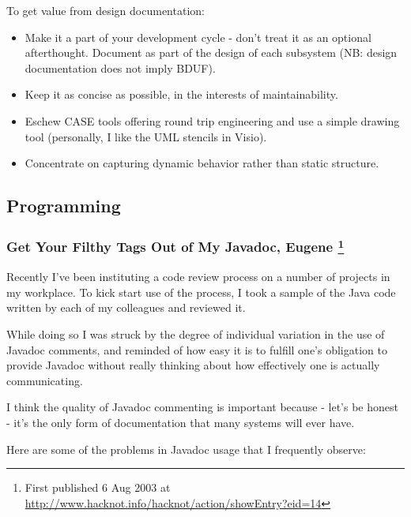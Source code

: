 \documentclass{article}
\begin{document}
\begin{enumerate}
To get value from design documentation:

\begin{itemize}
\item Make it a part of your development cycle - don't treat it as an
optional afterthought. Document as part of the design of each
subsystem (NB: design documentation does not imply BDUF).
\item Keep it as concise as possible, in the interests of maintainability.
\item Eschew CASE tools offering round trip engineering and use a simple
drawing tool (personally, I like the UML stencils in Visio).\\
\item Concentrate on capturing dynamic behavior rather than static
structure.
\end{itemize}
\end{enumerate}

\subsection{Programming}
\label{sec:orgheadline278}

\subsubsection{Get Your Filthy Tags Out of My Javadoc, Eugene \footnote{First published 6 Aug 2003 at
\url{http://www.hacknot.info/hacknot/action/showEntry?eid=14}}}
\label{sec:orgheadline263}

Recently I've been instituting a code review process on a number of
projects in my workplace. To kick start use of the process, I took a
sample of the Java code written by each of my colleagues and reviewed
it.

While doing so I was struck by the degree of individual variation in the
use of Javadoc comments, and reminded of how easy it is to fulfill one's
obligation to provide Javadoc without really thinking about how
effectively one is actually communicating.

I think the quality of Javadoc commenting is important because - let's
be honest - it's the only form of documentation that many systems will
ever have.

Here are some of the problems in Javadoc usage that I frequently
observe:
\end{document}
